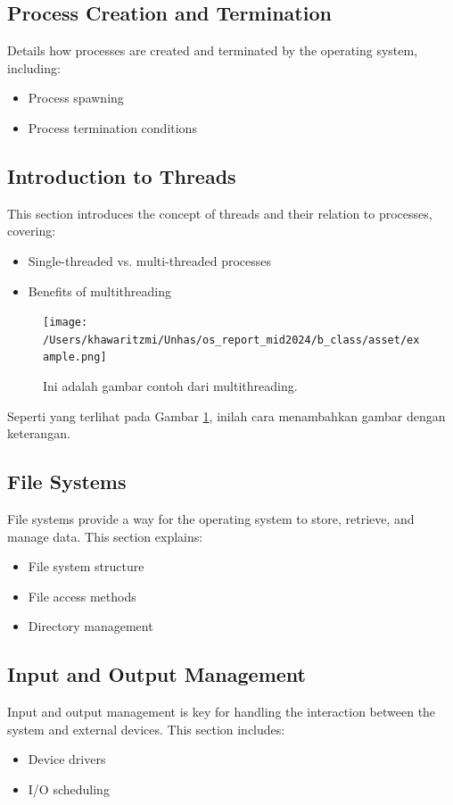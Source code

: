 \documentclass[12pt]{article}
\begin{document}
\subsection{Process Creation and Termination}
Details how processes are created and terminated by the operating system, including:
\begin{itemize}
    \item Process spawning
    \item Process termination conditions
\end{itemize}

\subsection{Introduction to Threads}
This section introduces the concept of threads and their relation to processes, covering:
\begin{itemize}
    \item Single-threaded vs. multi-threaded processes
    \item Benefits of multithreading
\end{itemize}

\begin{figure}[h]
    \centering
    \texttt{[image: /Users/khawaritzmi/Unhas/os\_report\_mid2024/b\_class/asset/example.png]}  %
    \caption{Ini adalah gambar contoh dari multithreading.}
    \label{fig:contoh_gambar}
\end{figure}

Seperti yang terlihat pada Gambar \ref{fig:contoh_gambar}, inilah cara menambahkan gambar dengan keterangan.

\subsection{File Systems}
File systems provide a way for the operating system to store, retrieve, and manage data. This section explains:
\begin{itemize}
    \item File system structure
    \item File access methods
    \item Directory management
\end{itemize}

\subsection{Input and Output Management}
Input and output management is key for handling the interaction between the system and external devices. This section includes:
\begin{itemize}
    \item Device drivers
    \item I/O scheduling
\end{itemize}
\end{document}
